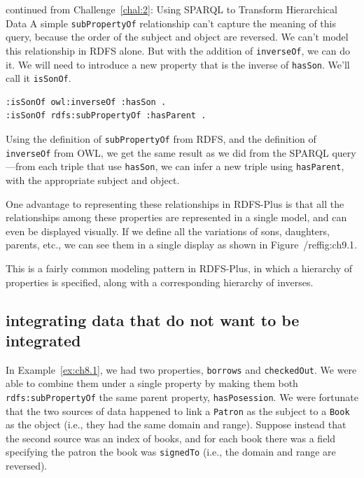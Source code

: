 \begin{challenge}{continued from Challenge~\protect\ref{chal:2}: Using SPARQL to Transform Hierarchical Data}
A simple \texttt{subPropertyOf} relationship can't capture the meaning of this
query, because the order of the subject and object are reversed. We
can't model this relationship in RDFS alone. But with the addition of
\texttt{inverseOf}, we can do it. We will need to introduce a new property that
is the inverse of \texttt{hasSon}. We'll call it \texttt{isSonOf}.

\begin{lstlisting}
:isSonOf owl:inverseOf :hasSon .
:isSonOf rdfs:subPropertyOf :hasParent .
\end{lstlisting}

Using the definition of \texttt{subPropertyOf} from RDFS, and the definition of
\texttt{inverseOf} from OWL, we get the same result as we did from the SPARQL
query---from each triple that use \texttt{hasSon}, we can infer a new triple
using \texttt{hasParent}, with the appropriate subject and object.

One advantage to representing these relationships in RDFS-Plus is that
all the relationships among these properties are represented in a single
model, and can even be displayed visually. If we define all the
variations of sons, daughters, parents, etc., we can see them in a
single display as shown in Figure~/ref{fig:ch9.1}.

This is a fairly common modeling pattern in RDFS-Plus, in which a
hierarchy of properties is specified, along with a corresponding
hierarchy of inverses.
\end{challenge}

\subsection{integrating data that do not want to be integrated}

In  Example~\ref{ex:ch8.1}, we had two properties, \texttt{borrows} and
\texttt{checkedOut}. We were able to combine them under a single property by
making them both \texttt{rdfs:subPropertyOf} the same parent property,
\texttt{hasPosession}. We were fortunate that the two sources of data happened to
link a \texttt{Patron} as the subject to a \texttt{Book} as the object (i.e., they had the
same domain and range). Suppose instead that the second source was an
index of books, and for each book there was a field specifying the
patron the book was \texttt{signedTo} (i.e., the domain and range are reversed).

